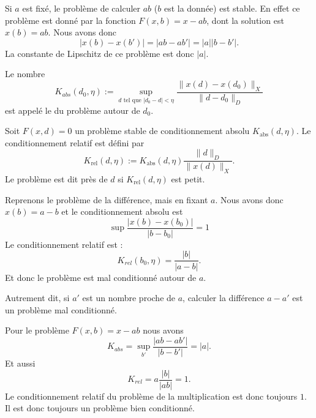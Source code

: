 \begin{example}
	Si \( a\) est fixé, le problème de calculer \( ab\) (\( b\) est la donnée) est stable. En effet ce problème est donné par la fonction \( F(x,b)=x-ab\), dont la solution est \( x(b)=ab\). Nous avons donc
	\begin{equation}
		\big| x(b)-x(b') \big|=| ab-ab' |=| a | |b-b' |.
	\end{equation}
	La constante de Lipschitz de ce problème est donc \( | a |\).
\end{example}

\begin{definition}
	Le nombre
	\begin{equation}        \label{EqDefAABSOLU}
		K_{abs}(d_0,\eta):=\sup_{d\text{ tel que }|d_0-d|<\eta}\frac{\| x(d)-x(d_0)\|_X}{\|d-d_0\|_D}
	\end{equation}
	est appelé le  du problème autour de \( d_0\).

	Soit \( F(x,d)=0\) un problème stable de conditionnement absolu \( K_{\text{abs}}(d,\eta)\).  Le conditionnement relatif est défini par
	\begin{equation}        \label{DEFEQooSXDBooYbvGrC}
		K_{\text{rel}}(d,\eta):=K_{\text{abs}}(d,\eta)\frac{\| d \|_D}{\|x(d)\|_X}.
	\end{equation}
	Le problème est dit  près de \( d\) si \( K_{\text{rel}}(d,\eta)\) est petit.
\end{definition}

\begin{example}
	Reprenons le problème de la différence, mais en fixant \( a\). Nous avons donc \( x(b)=a-b\) et le conditionnement absolu est
	\begin{equation}
		\sup\frac{ | x(b)-x(b_0) | }{ | b-b_0 | }=1
	\end{equation}
	Le conditionnement relatif est :
	\begin{equation}
		K_{rel}(b_0,\eta)=\frac{ | b | }{ | a-b | }.
	\end{equation}
	Et donc le problème est mal conditionné autour de \( a\).

	Autrement dit, si \( a'\) est un nombre proche de \( a\), calculer la différence \( a-a'\) est un problème mal conditionné.
\end{example}

\begin{example}
	Pour le problème \( F(x,b)=x-ab\) nous avons
	\begin{equation}
		K_{abs}=\sup_{b'}\frac{ | ab-ab' | }{ | b-b' | }=| a |.
	\end{equation}
	Et aussi
	\begin{equation}
		K_{rel}=a\frac{ | b | }{ | ab | }=1.
	\end{equation}
	Le conditionnement relatif du problème de la multiplication est donc toujours \( 1\). Il est donc toujours un problème bien conditionné.
\end{example}


